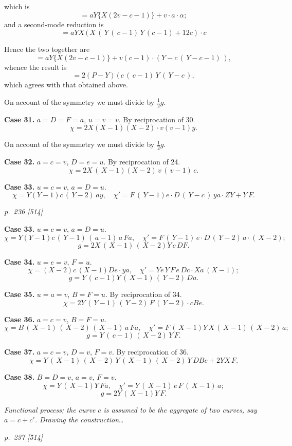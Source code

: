 \documentclass[11pt,a4paper]{article}
\theoremstyle{plain}
\theoremstyle{definition}
\begin{document}
which is
\[
=aY\{X(2v-c-1)\}+v\cdot a\cdot \alpha;
\]
and a second-mode reduction is
\[
=aYX\,(\,X\,(\,Y\,(\,c-1)\,Y\,(c-1)+12c)\cdot c
\]

Hence the two together are
\[
=aY\{X(2v-c-1)\}+v(c-1)\cdot (Y-c\,(\,Y-c-1)\,),
\]
whence the result is
\[
=2(P-Y)\,(\,c\,(\,c-1)\,Y\,(\,Y-c\,),
\]
which agrees with that obtained above.

On account of the symmetry we must divide by $\frac{1}{2}g$.

\textbf{Case 31.}  $a=D=F=a$, $u=v=v$.  By reciprocation of 30.
\[
\chi=2X(X-1)(X-2)\cdot v(v-1)y.
\]

On account of the symmetry we must divide by $\frac{1}{2}g$.

\textbf{Case 32.}  $a=c=v$, $D=e=u$.  By reciprocation of 24.
\[
\chi=2X\,(\,X-1)(X-2)\,v\,(\,v-1)\,c.
\]

\textbf{Case 33.}  $u=c=v$, $a=D=u$.
\[
\chi=Y(Y-1)c\,(\,Y-2)\,ay, \quad \chi'=F\,(\,Y-1)e\cdot D\,(\,Y-c\,)\,ya\cdot ZY+Y\,F.
\]

\bigskip
\textit{p.~236 [514]}
\smallskip

\textbf{Case 33.}  $u=c=v$, $a=D=u$.
\[
\chi=Y(Y-1)c\,(\,Y-1)\,(\,a-1)\,a\,Fa, \quad \chi'=F\,(\,Y-1)\,e\cdot D\,(\,Y-2)\,a\cdot (\,X-2);
\]
\[
g=2X\,(\,X-1)\,(\,X-2)Y\,c\,DF.
\]

\textbf{Case 34.}  $u=e=v$, $F=u$.
\[
\chi=(X-2)c\,(X-1)De\cdot ya, \quad \chi'=Ye\,Y\,F\,e\,Dc\cdot Xa\,(X-1);
\]
\[
g=Y\,(\,c-1)Y\,(\,X-1)\,(\,Y-2)\,Da.
\]

\textbf{Case 35.}  $u=a=v$, $B=F=u$.  By reciprocation of 34.
\[
\chi=2Y\,(\,Y-1)\,(\,Y-2)\,F\,(\,Y-2)\cdot cBe.
\]

\textbf{Case 36.}  $a=c=v$, $B=F=u$.
\[
\chi=B\,(\,X-1)\,(\,X-2)\,(\,X-1)\,a\,Fa, \quad \chi'=F\,(\,X-1)Y\,X\,(\,X-1)\,(\,X-2)\,a;
\]
\[
g=Y\,(\,c-1)\,(\,X-2)\,Y\,F.
\]

\textbf{Case 37.}  $a=c=v$, $D=v$, $F=v$.  By reciprocation of 36.
\[
\chi=Y\,(\,X-1)\,(\,X-2)\,Y\,(\,X-1)\,(\,X-2)\,Y\,DBe+2YX\,F.
\]

\textbf{Case 38.}  $B=D=v$, $a=v$, $F=v$.
\[
\chi=Y\,(\,X-1)Y\,Fa, \quad \chi'=Y\,(\,X-1)\,e\,F\,(\,X-1)\,a;
\]
\[
g=2Y\,(\,X-1)Y\,F.
\]

\textit{Functional process; the curve $c$ is assumed to be the aggregate of two curves, say
$a=c+c'$.  Drawing the construction}\dots

\clearpage

\bigskip
\textit{p.~237 [514]}
\smallskip
\end{document}
